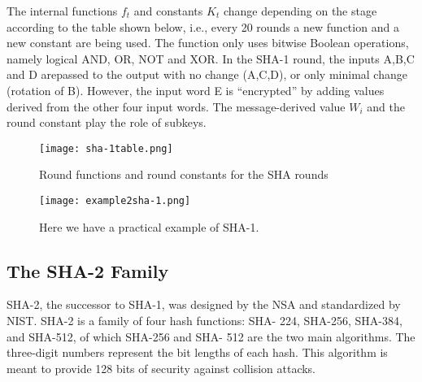 \documentclass{article}
\begin{document}
\begin{enumerate}
\begin{figure} [H]
    \end{figure}
    \newline The internal functions $f_t$ and constants $K_t$ change depending on the stage according to the table shown below, i.e., every 20 rounds a new function and a new constant are being used. The function only uses bitwise Boolean operations, namely logical AND, OR, NOT and XOR.  In the  SHA-1  round,  the  inputs A,B,C and D arepassed to the output with no change (A,C,D), or only minimal change (rotation of B). However, the input word E is “encrypted” by adding values derived from the other four input words. The message-derived value $W_i$ and the round constant play the role of subkeys.
    \begin{figure} [H]
        \centering
        \texttt{[image: sha-1table.png]}
        \caption{Round functions and round constants for the SHA rounds}
    \end{figure}
\end{enumerate}

\begin{figure} [H]
    \centering
    \texttt{[image: example2sha-1.png]}
    \caption{Here we have a practical example of SHA-1.}
\end{figure}
\subsection{The SHA-2 Family}
SHA-2, the successor to SHA-1, was designed by the NSA and
standardized by NIST. SHA-2 is a family of four hash functions: SHA-
224, SHA-256, SHA-384, and SHA-512, of which SHA-256 and SHA-
512 are the two main algorithms. The three-digit numbers represent the
bit lengths of each hash. This algorithm is meant to provide 128 bits of security against collision attacks.
\end{document}
